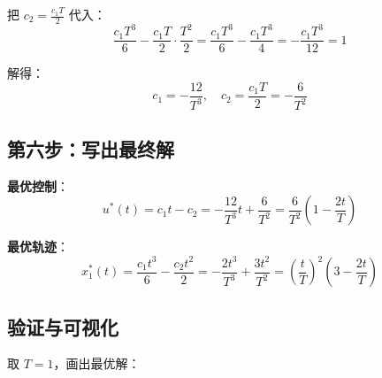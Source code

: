 把 $c_2 = \frac{c_1 T}{2}$ 代入：
\[
\frac{c_1 T^3}{6} - \frac{c_1 T}{2} \cdot \frac{T^2}{2} = \frac{c_1 T^3}{6} - \frac{c_1 T^3}{4} = -\frac{c_1 T^3}{12} = 1
\]

解得：
\[
c_1 = -\frac{12}{T^3}, \quad c_2 = \frac{c_1 T}{2} = -\frac{6}{T^2}
\]

\subsection{第六步：写出最终解}

\begin{keyformula}[title=最优解]
\textbf{最优控制}：
\begin{equation}
u^*(t) = c_1 t - c_2 = -\frac{12}{T^3} t + \frac{6}{T^2} = \frac{6}{T^2}\left(1 - \frac{2t}{T}\right)
\end{equation}

\textbf{最优轨迹}：
\begin{equation}
x_1^*(t) = \frac{c_1 t^3}{6} - \frac{c_2 t^2}{2} = -\frac{2t^3}{T^3} + \frac{3t^2}{T^2} = \left(\frac{t}{T}\right)^2 \left(3 - \frac{2t}{T}\right)
\end{equation}
\end{keyformula}

\subsection{验证与可视化}

取 $T = 1$，画出最优解：

